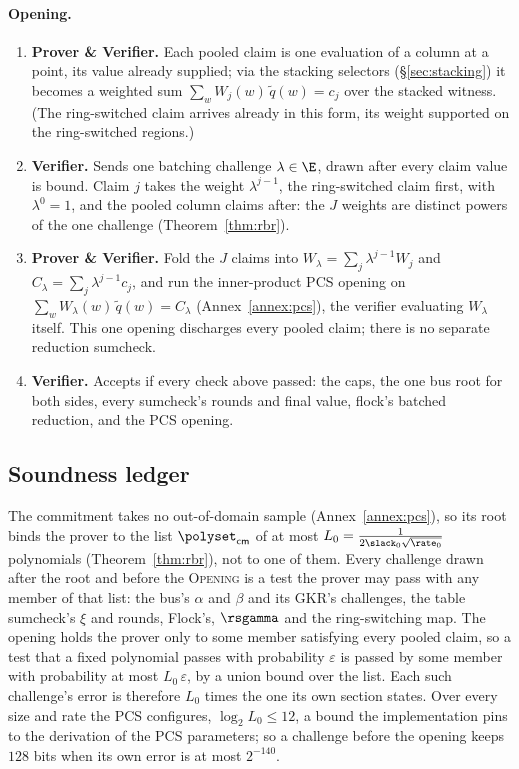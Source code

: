 \paragraph{Opening.}

\begin{enumerate}
\item \textbf{Prover \& Verifier.} Each pooled claim is one evaluation of a column at a point, its value already supplied; via the stacking selectors (\S\ref{sec:stacking}) it becomes a weighted sum $\sum_w W_j(w)\,\widetilde q(w)=c_j$ over the stacked witness. (The ring-switched claim arrives already in this form, its weight supported on the ring-switched regions.)
\item \textbf{Verifier.} Sends one batching challenge $\lambda\in\E$, drawn after every claim value is bound. Claim $j$ takes the weight $\lambda^{j-1}$, the ring-switched claim first, with $\lambda^0=1$, and the pooled column claims after: the $J$ weights are distinct powers of the one challenge (Theorem~\ref{thm:rbr}).
\item \textbf{Prover \& Verifier.} Fold the $J$ claims into $W_\lambda=\sum_j\lambda^{j-1} W_j$ and $C_\lambda=\sum_j\lambda^{j-1} c_j$, and run the inner-product PCS opening on $\sum_w W_\lambda(w)\,\widetilde q(w)=C_\lambda$ (Annex~\ref{annex:pcs}), the verifier evaluating $W_\lambda$ itself. This one opening discharges every pooled claim; there is no separate reduction sumcheck.
\item \textbf{Verifier.} Accepts if every check above passed: the caps, the one bus root for both sides, every sumcheck's rounds and final value, flock's batched reduction, and the PCS opening.
\end{enumerate}

\subsection{Soundness ledger}\label{sec:e2e-ledger}

The commitment takes no out-of-domain sample (Annex~\ref{annex:pcs}), so its root binds the prover to the list $\polyset_{\mathsf{cm}}$ of at most $L_0=\tfrac{1}{2\slack_0\sqrt{\rate_0}}$ polynomials (Theorem~\ref{thm:rbr}), not to one of them. Every challenge drawn after the root and before the \textsc{Opening} is a test the prover may pass with any member of that list: the bus's $\alpha$ and $\beta$ and its GKR's challenges, the table sumcheck's $\xi$ and rounds, Flock's, $\rsgamma$ and the ring-switching map. The opening holds the prover only to some member satisfying every pooled claim, so a test that a fixed polynomial passes with probability $\varepsilon$ is passed by some member with probability at most $L_0\,\varepsilon$, by a union bound over the list. Each such challenge's error is therefore $L_0$ times the one its own section states. Over every size and rate the PCS configures, $\log_2L_0\le12$, a bound the implementation pins to the derivation of the PCS parameters; so a challenge before the opening keeps $128$ bits when its own error is at most $2^{-140}$.

